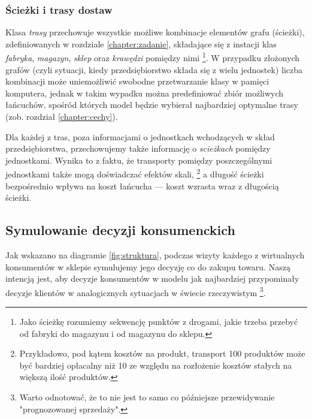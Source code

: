 \documentclass[polish, twoside, 12pt, a4paper]{article}
\theoremstyle{definition}
\theoremstyle{plain}
\theoremstyle{remark}
\begin{document}
\subsubsection{Ścieżki i trasy dostaw}

Klasa \textit{trasy} przechowuje wszystkie możliwe kombinacje elementów grafu (ścieżki), zdefiniowanych w rozdziale \ref{chapter:zadanie}, składające się z instacji klas \textit{fabryka}, \textit{magazyn}, \textit{sklep} oraz \textit{krawędzi} pomiędzy nimi \footnote{Jako ścieżkę rozumiemy sekwencję punktów z drogami, jakie trzeba przebyć od fabryki do magazynu i od magazynu do sklepu.}. W przypadku złożonych grafów (czyli sytuacji, kiedy przedsiębiorstwo składa się z wielu jednostek) liczba kombinacji może uniemożliwić swobodne przetwarzanie klasy w pamięci komputera, jednak w takim wypadku można predefiniować zbiór możliwych łańcuchów, spośród których model będzie wybierał najbardziej optymalne trasy (zob. rozdział \ref{chapter:cechy}).

Dla każdej z tras, poza informacjami o jednostkach wchodzących w skład przedsiębiorstwa, przechowujemy także informację o \textit{scieżkach} pomiędzy jednostkami. Wynika to z faktu, że transporty pomiędzy poszczególnymi jednostkami także mogą doświadczać efektów skali, \footnote{Przykładowo, pod kątem kosztów na produkt, transport 100 produktów może być bardziej opłacalny niż 10 ze względu na rozłożenie kosztów stałych na większą ilość produktów.} a długość ścieżki bezpośrednio wpływa na koszt łańcucha --- koszt wzrasta wraz z długością ścieżki.

\subsection{Symulowanie decyzji konsumenckich} \label{chapter:customerresearch}

Jak wskazano na diagramie \ref{fig:struktura}, podczas wizyty każdego z wirtualnych konsumentów w sklepie symulujemy jego decyzję co do zakupu towaru. Naszą intencją jest, aby decyzje konsumentów w modelu jak najbardziej przypominały decyzje klientów w analogicznych sytuacjach w świecie rzeczywistym \footnote{Warto odnotować, że to nie jest to samo co późniejsze przewidywanie "prognozowanej sprzedaży".}.
\end{document}
